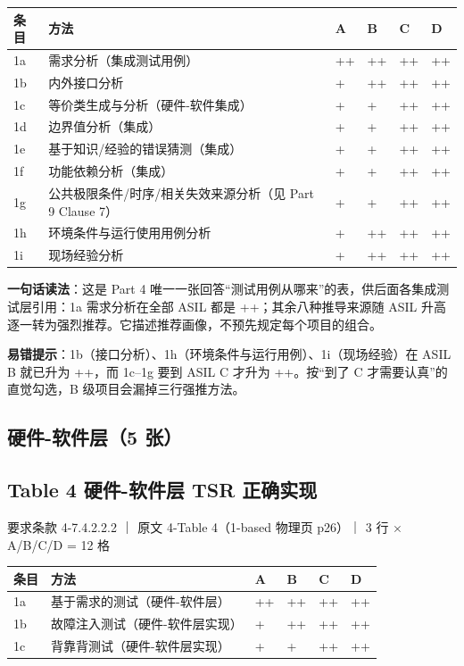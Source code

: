 \begin{center}
\begingroup\small
\setlength{\tabcolsep}{4pt}
\begin{tabularx}{\linewidth}{@{}XXXXXX@{}}
\toprule
条目 & 方法 & A & B & C & D \\
\midrule
1a & 需求分析（集成测试用例） & ++ & ++ & ++ & ++ \\
1b & 内外接口分析 & + & ++ & ++ & ++ \\
1c & 等价类生成与分析（硬件-软件集成） & + & + & ++ & ++ \\
1d & 边界值分析（集成） & + & + & ++ & ++ \\
1e & 基于知识/经验的错误猜测（集成） & + & + & ++ & ++ \\
1f & 功能依赖分析（集成） & + & + & ++ & ++ \\
1g & 公共极限条件/时序/相关失效来源分析（见 Part 9 Clause 7） & + & + & ++ & ++ \\
1h & 环境条件与运行使用用例分析 & + & ++ & ++ & ++ \\
1i & 现场经验分析 & + & ++ & ++ & ++ \\
\bottomrule
\end{tabularx}
\endgroup
\end{center}

\textbf{一句话读法}：这是 Part 4 唯一一张回答“测试用例从哪来”的表，供后面各集成测试层引用：1a 需求分析在全部 ASIL 都是 ++；其余八种推导来源随 ASIL 升高逐一转为强烈推荐。它描述推荐画像，不预先规定每个项目的组合。

\textbf{易错提示}：1b（接口分析）、1h（环境条件与运行用例）、1i（现场经验）在 ASIL B 就已升为 ++，而 1c–1g 要到 ASIL C 才升为 ++。按“到了 C 才需要认真”的直觉勾选，B 级项目会漏掉三行强推方法。

\subsection{硬件-软件层（5 张）}

\subsection{Table 4 硬件-软件层 TSR 正确实现}

要求条款 4-7.4.2.2.2 ｜ 原文 4-Table 4（1-based 物理页 p26）｜ 3 行 \(\times\) A/B/C/D = 12 格

\begin{center}
\begingroup\small
\setlength{\tabcolsep}{4pt}
\begin{tabularx}{\linewidth}{@{}XXXXXX@{}}
\toprule
条目 & 方法 & A & B & C & D \\
\midrule
1a & 基于需求的测试（硬件-软件层） & ++ & ++ & ++ & ++ \\
1b & 故障注入测试（硬件-软件层实现） & + & ++ & ++ & ++ \\
1c & 背靠背测试（硬件-软件层实现） & + & + & ++ & ++ \\
\bottomrule
\end{tabularx}
\endgroup
\end{center}

